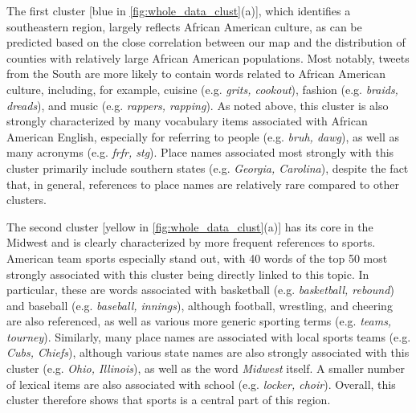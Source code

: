 \documentclass[../thesis.tex]{subfiles}
\begin{document}
The first cluster [blue in \cref{fig:whole_data_clust}(a)], which identifies a
southeastern region, largely reflects African American culture, as can be predicted
based on the close correlation between our map and the distribution of counties with
relatively large African American populations. Most notably, tweets from
the South are more likely to contain words related to African American culture,
including, for example, cuisine (e.g. \textit{grits, cookout}), fashion (e.g.
\textit{braids, dreads}), and music (e.g. \textit{rappers, rapping}). As noted above,
this cluster is also strongly characterized by many vocabulary items associated with
African American English, especially for referring to people (e.g. \textit{bruh, dawg}),
as well as many acronyms (e.g. \textit{frfr, stg}). Place names associated most strongly
with this cluster primarily include southern states (e.g. \textit{Georgia, Carolina}),
despite the fact that, in general, references to place names are relatively rare
compared to other clusters.

The second cluster [yellow in \cref{fig:whole_data_clust}(a)] has its core in the
Midwest and is clearly characterized by more frequent references to sports. American
team sports especially stand out, with 40 words of the top 50 most strongly associated
with this cluster being directly linked to this topic. In particular, these are words
associated with basketball (e.g. \textit{basketball, rebound}) and baseball (e.g.
\textit{baseball, innings}), although football, wrestling, and cheering are also
referenced, as well as various more generic sporting terms (e.g. \textit{teams,
tourney}). Similarly, many place names are associated with local sports teams (e.g.
\textit{Cubs, Chiefs}), although various state names are also strongly associated with
this cluster (e.g. \textit{Ohio, Illinois}), as well as the word \textit{Midwest}
itself.  A smaller number of lexical items are also associated with school (e.g.
\textit{locker, choir}). Overall, this cluster therefore shows that sports is a central
part of this region. 
\end{document}
